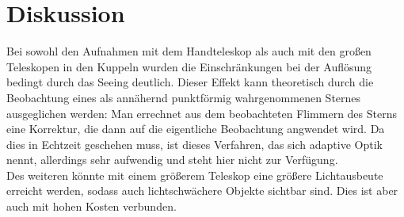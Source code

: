 \section{Diskussion}
Bei sowohl den Aufnahmen mit dem Handteleskop als auch mit den großen Teleskopen in den Kuppeln wurden die Einschränkungen bei der Auflösung bedingt durch das Seeing deutlich. Dieser Effekt kann theoretisch durch die Beobachtung eines als annähernd punktförmig wahrgenommenen Sternes ausgeglichen werden: Man errechnet aus dem beobachteten Flimmern des Sterns eine Korrektur, die dann auf die eigentliche Beobachtung angwendet wird. Da dies in Echtzeit geschehen muss, ist dieses Verfahren, das sich adaptive Optik nennt, allerdings sehr aufwendig und steht hier nicht zur Verfügung. \\
Des weiteren könnte mit einem größerem Teleskop eine größere Lichtausbeute erreicht werden, sodass auch lichtschwächere Objekte sichtbar sind. Dies ist aber auch mit hohen Kosten verbunden. 


